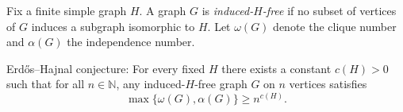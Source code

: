 Fix a finite simple graph $H$. A graph $G$ is \emph{induced-$H$-free} if no subset of vertices of $G$ induces a 
subgraph isomorphic to $H$.
Let $\omega(G)$ denote the clique number and $\alpha(G)$ the independence number.

Erd\H{o}s--Hajnal conjecture: For every fixed $H$ there exists a constant $c(H)>0$ such that for all $n\in\mathbb{N}$, 
any induced-$H$-free graph $G$ on $n$ vertices satisfies
\[
\max\{\omega(G),\alpha(G)\}\ge n^{c(H)}.
\]
